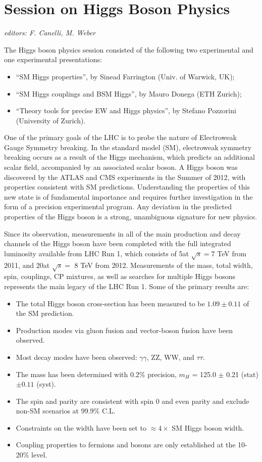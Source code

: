 \section{Session on Higgs Boson Physics}\label{higgs}{\it editors: F. Canelli, M. Weber}

\noindent The Higgs boson physics session consisted of the following two experimental and one experimental presentations:
\begin{itemize} \setlength{\itemsep}{-1ex}
\item ``SM Higgs properties'', by Sinead Farrington (Univ. of Warwick, UK);
\item ``SM Higgs couplings and BSM Higgs'', by Mauro Donega (ETH Zurich);
\item ``Theory tools for precise EW and Higgs physics'', by Stefano Pozzorini (University of Zurich).
\end{itemize}

\noindent One of the primary goals of the LHC is to probe the nature of Electroweak Gauge 
Symmetry breaking. In the standard model (SM), electroweak symmetry
breaking occurs as a result of the Higgs mechanism, which predicts an
additional scalar field, accompanied by an associated scalar boson. A
Higgs boson was discovered by the ATLAS and CMS experiments in the
Summer of 2012, with properties consistent with SM predictions.
Understanding the properties of this new state is of fundamental
importance and requires further investigation in the form of a precision
experimental program. Any deviation in the predicted properties of the
Higgs boson is a strong, unambiguous signature for new physics. 
\medskip

\noindent Since its observation, measurements in all of the main production and decay
channels of the Higgs boson have been completed with the full integrated
luminosity available from LHC Run 1, which consists of 5\fb  at $\sqrt{s} = 7$
TeV from 2011, and 20\fb at  $\sqrt{s} =$  8 TeV from 2012. 
Measurements of the mass, total width, spin, couplings, CP mixtures, as well as searches for
multiple Higgs bosons represents the main legacy of the LHC Run 1. Some
of the primary results are: 

\begin{itemize}
\item The total Higgs boson cross-section has been measured to be $1.09 \pm 0.11$ of the SM prediction.
\item Production modes via gluon fusion and vector-boson fusion have been observed. 
\item Most decay modes have been observed: $\gamma \gamma$, ZZ, WW, and $\tau\tau$.
\item The mass has been determined with 0.2\% precision,  $m_H$ = 125.0 $\pm$ 0.21 (stat) $\pm 0.11$ (syst).
\item The spin and parity are consistent with spin 0 and even parity and exclude non-SM scenarios at 99.9\% C.L.
\item Constraints on the width have been set to $\approx 4 \times$  SM Higgs boson width. 
\item Coupling properties to fermions and bosons are only established at the 10-20\% level.
\end{itemize}

